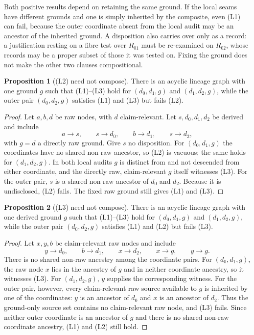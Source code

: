 \documentclass[11pt]{article}
\theoremstyle{definition}
\newtheorem{proposition}{Proposition}[section]
\begin{document}
Both positive results depend on retaining the same ground. If the local seams have different grounds and one is simply inherited by the composite, even (L1) can fail, because the outer coordinate absent from the local audit may be an ancestor of the inherited ground. A disposition also carries over only as a record: a justification resting on a fibre test over $R_{01}$ must be re-examined on $R_{02}$, whose records may be a proper subset of those it was tested on. Fixing the ground does not make the other two clauses compositional.

\begin{proposition}[(L2) need not compose]\label{ex:prop:l2-noncompose}
There is an acyclic lineage graph with one ground $g$ such that (L1)--(L3) hold for $(d_0,d_1,g)$ and $(d_1,d_2,g)$, while the outer pair $(d_0,d_2,g)$ satisfies (L1) and (L3) but fails (L2).
\end{proposition}
\begin{proof}
Let $a,b,d$ be raw nodes, with $d$ claim-relevant. Let $s,d_0,d_1,d_2$ be derived and include
\[
a\to s,\qquad s\to d_0,\qquad b\to d_1,\qquad s\to d_2,
\]
with $g=d$ a directly raw ground. Give $s$ no disposition. For $(d_0,d_1,g)$ the coordinates have no shared non-raw ancestor, so (L2) is vacuous; the same holds for $(d_1,d_2,g)$. In both local audits $g$ is distinct from and not descended from either coordinate, and the directly raw, claim-relevant $g$ itself witnesses (L3). For the outer pair, $s$ is a shared non-raw ancestor of $d_0$ and $d_2$. Because it is undisclosed, (L2) fails. The fixed raw ground still gives (L1) and (L3).
\end{proof}

\begin{proposition}[(L3) need not compose]\label{ex:prop:l3-noncompose}
There is an acyclic lineage graph with one derived ground $g$ such that (L1)--(L3) hold for $(d_0,d_1,g)$ and $(d_1,d_2,g)$, while the outer pair $(d_0,d_2,g)$ satisfies (L1) and (L2) but fails (L3).
\end{proposition}
\begin{proof}
Let $x,y,b$ be claim-relevant raw nodes and include
\[
y\to d_0,\qquad b\to d_1,\qquad x\to d_2,\qquad x\to g,\qquad y\to g.
\]
There is no shared non-raw ancestry among the coordinate pairs. For $(d_0,d_1,g)$, the raw node $x$ lies in the ancestry of $g$ and in neither coordinate ancestry, so it witnesses (L3). For $(d_1,d_2,g)$, $y$ supplies the corresponding witness. For the outer pair, however, every claim-relevant raw source available to $g$ is inherited by one of the coordinates: $y$ is an ancestor of $d_0$ and $x$ is an ancestor of $d_2$. Thus the ground-only source set contains no claim-relevant raw node, and (L3) fails. Since neither outer coordinate is an ancestor of $g$ and there is no shared non-raw coordinate ancestry, (L1) and (L2) still hold.
\end{proof}
\end{document}
